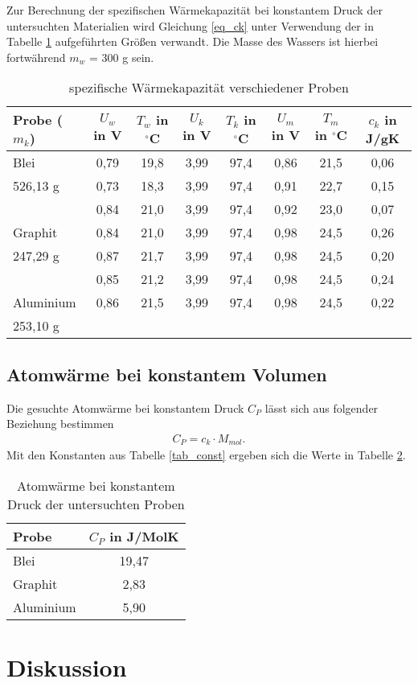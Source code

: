 Zur Berechnung der spezifischen Wärmekapazität bei konstantem Druck der untersuchten Materialien wird Gleichung \eqref{eq_ck} unter Verwendung der in Tabelle
\ref{tab_ck} aufgeführten Größen verwandt. Die Masse des Wassers ist hierbei fortwährend $m_w$ = 300 g sein.

\begin{table}[H]
 \begin{tabular}{l|c|c|c|c|c|c|c}
 Probe ($m_k$)& $U_w$ in V & $T_w$ in $^\circ$C & $U_k$ in V & $T_k$ in $^\circ$C & $U_m$ in V & $T_m$ in $^\circ$C & $c_k$ in J/gK\\
 \hline
Blei&	0,79&	19,8&	3,99&	97,4&	0,86&	21,5 & 0,06\\
526,13 g&	0,73&	18,3&	3,99&	97,4&	0,91&	22,7 & 0,15\\
	&0,84&	21,0&	3,99&	97,4&	0,92&	23,0 & 0,07\\
	\hline
Graphit	&0,84&	21,0&	3,99&	97,4&	0,98&	24,5 & 0,26\\
247,29	g&0,87&	21,7&	3,99&	97,4&	0,98&	24,5 & 0,20\\
	&0,85&	21,2&	3,99&	97,4&	0,98&	24,5 & 0,24\\
	\hline
Aluminium&	0,86&	21,5&	3,99&	97,4&	0,98&	24,5 & 0,22\\
253,10 g	& & & & & &				

 \end{tabular}
\caption{spezifische Wärmekapazität verschiedener Proben}
\label{tab_ck}
\end{table}

\subsection{Atomwärme bei konstantem Volumen}
Die gesuchte Atomwärme bei konstantem Druck $C_P$ lässt sich aus folgender Beziehung bestimmen
\begin{align}
 C_P = c_k \cdot M_{mol}.
\end{align}
Mit den Konstanten aus Tabelle \ref{tab_const} ergeben sich die Werte in Tabelle \ref{tab_cp}.
\begin{table}[H]
 \begin{tabular}{l|c}
 Probe & $C_P$ in J/MolK\\
 \hline
Blei &19,47\\
Graphit &2,83\\
Aluminium &5,90
 \end{tabular}
\caption{Atomwärme bei konstantem Druck der untersuchten Proben}
\label{tab_cp}
\end{table}


\section{Diskussion}






